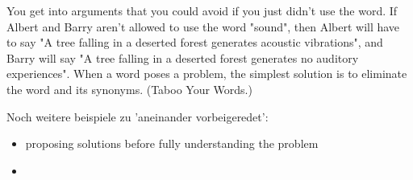 \begin{frame}[c]
    You get into arguments that you could avoid if you just didn't use the word. If Albert and Barry aren't allowed to use the word "sound", then Albert will have to say "A tree falling in a deserted forest generates acoustic vibrations", and Barry will say "A tree falling in a deserted forest generates no auditory experiences".  When a word poses a problem, the simplest solution is to eliminate the word and its synonyms.  (Taboo Your Words.)
\end{frame}


\begin{frame}[c]
    Noch weitere beispiele zu 'aneinander vorbeigeredet':
    \begin{itemize}[<+(1)->]
        \item proposing solutions before fully understanding the problem
        \item
    \end{itemize}
\end{frame}


